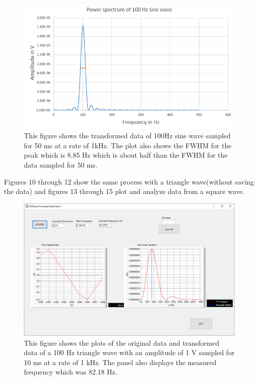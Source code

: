 \documentclass{article}
\begin{document}
\begin{figure}[H]
\includegraphics[scale=0.55, center]{Fouriersine50ms.PNG}
\caption{This figure shows the transformed data of 100Hz sine wave sampled for 50 ms at a rate of 1kHz.  The plot also shows the FWHM for the peak which is 8.85 Hz which is about half than the FWHM for the data sampled for 50 ms.}
\end{figure}

Figures 10 through 12 show the same process with a triangle wave(without saving the data) and figures 13 through 15 plot and analyze data from a square wave.

\begin{figure}[H]
\includegraphics[scale=0.4,center]{Triangle10ms.png}
\caption{This figure shows the plots of the original data and transformed data of a 100 Hz triangle wave with an amplitude of 1 V sampled for 10 ms at a rate of 1 kHz.  The panel also displays the measured frequency which was 82.18 Hz.}
\end{figure}
\end{document}
